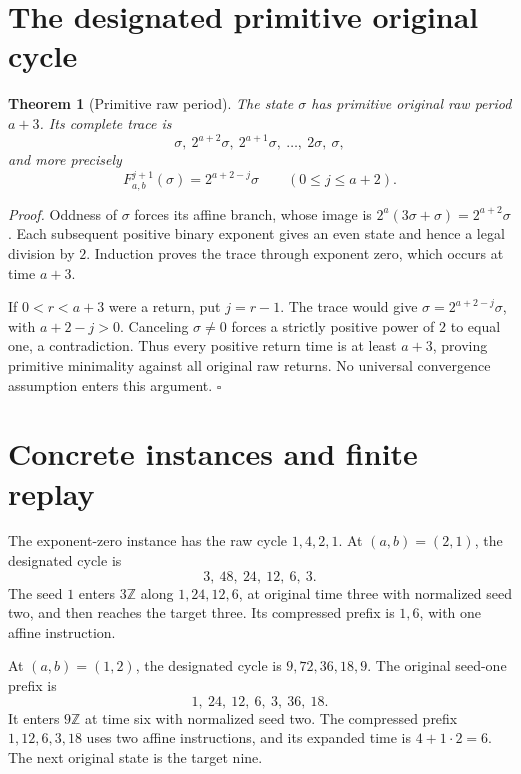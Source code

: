 \documentclass[11pt,letterpaper]{article}
\newcommand{\Z}{\mathbb{Z}}
\newtheorem{theorem}{Theorem}
\newenvironment{proof}{\noindent\textit{Proof.}}{\hfill\(\square\)}
\begin{document}
\section{The designated primitive original cycle}

\begin{theorem}[Primitive raw period]\label{PrimitiveCycle}
The state \(\sigma\) has primitive original raw period \(a+3\).
Its complete trace is
\[
\sigma,\ 2^{a+2}\sigma,\ 2^{a+1}\sigma,\ \ldots,\ 2\sigma,\ \sigma,
\]
and more precisely
\[
F_{a,b}^{j+1}(\sigma)=2^{a+2-j}\sigma
\qquad(0\le j\le a+2).
\]
\end{theorem}

\begin{proof}
Oddness of \(\sigma\) forces its affine branch, whose image is
\(2^a(3\sigma+\sigma)=2^{a+2}\sigma\).
Each subsequent positive binary exponent gives an even state and hence
a legal division by \(2\). Induction proves the trace through exponent zero,
which occurs at time \(a+3\).

If \(0<r<a+3\) were a return, put \(j=r-1\).
The trace would give
\(\sigma=2^{a+2-j}\sigma\), with \(a+2-j>0\).
Canceling \(\sigma\ne0\) forces a strictly positive power of \(2\) to
equal one, a contradiction. Thus every positive return time is at least
\(a+3\), proving primitive minimality against all original raw returns.
No universal convergence assumption enters this argument.
\end{proof}

\section{Concrete instances and finite replay}

The exponent-zero instance has the raw cycle \(1,4,2,1\).
At \((a,b)=(2,1)\), the designated cycle is
\[
3,\ 48,\ 24,\ 12,\ 6,\ 3.
\]
The seed \(1\) enters \(3\Z\) along \(1,24,12,6\), at original time three
with normalized seed two, and then reaches the target three.
Its compressed prefix is \(1,6\), with one affine instruction.

At \((a,b)=(1,2)\), the designated cycle is \(9,72,36,18,9\).
The original seed-one prefix is
\[
1,\ 24,\ 12,\ 6,\ 3,\ 36,\ 18.
\]
It enters \(9\Z\) at time six with normalized seed two.
The compressed prefix \(1,12,6,3,18\) uses two affine instructions,
and its expanded time is \(4+1\cdot2=6\).
The next original state is the target nine.
\end{document}
